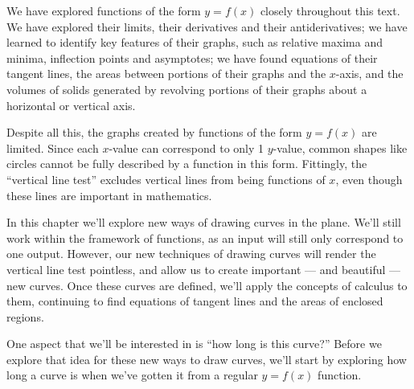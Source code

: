 
We have explored functions of the form $y=f(x)$ closely throughout this text. We have explored their limits, their derivatives and their antiderivatives; we have learned to identify key features of their graphs, such as relative maxima and minima, inflection points and asymptotes; we have found equations of their tangent lines, the areas between portions of their graphs and the $x$-axis, and the volumes of solids generated by revolving portions of their graphs about a horizontal or vertical axis.

Despite all this, the graphs created by functions of the form $y=f(x)$ are limited. Since each $x$-value can correspond to only 1 $y$-value, common shapes like circles cannot be fully described by a function in this form.  Fittingly, the ``vertical line test''  excludes vertical lines from being functions of $x$, even though these lines are important in mathematics.

In this chapter we'll explore new ways of drawing curves in the plane. We'll still work within the framework of functions, as an input will still only correspond to one output. However, our new techniques of drawing curves will render the vertical line test pointless, and allow us to create important --- and beautiful --- new curves. Once these curves are defined, we'll apply the concepts of calculus to them, continuing to find equations of tangent lines and the areas of enclosed regions.

One aspect that we'll be interested in is ``how long is this curve?'' Before we explore that idea for these new ways to draw curves, we'll start by exploring how long a curve is when we've gotten it from a regular $y=f(x)$ function.







\cleardoublepage
